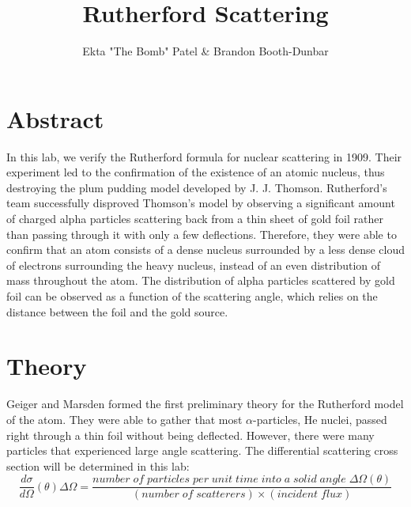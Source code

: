 
\newcommand{\ig}[2][width=4in]{\texttt{[image: \#2]}}    		
\usepackage{graphicx}					
\usepackage{amssymb}
\usepackage{pgfplotstable}
\usepackage{float}
\usepackage{caption}
\captionsetup[table]{justification=justified,singlelinecheck=false, position=bottom}


\header {\today}							
\title{Rutherford Scattering}
\author{Ekta "The Bomb" Patel \& Brandon Booth-Dunbar}

\section{Abstract}
\begin{em} In this lab, we verify the Rutherford formula for nuclear scattering in 1909. Their experiment led to the confirmation of the existence of an atomic nucleus, thus destroying the plum pudding model  developed by J. J. Thomson. Rutherford's team successfully disproved Thomson's model by observing a significant amount of charged alpha particles scattering back from a thin sheet of gold foil rather than passing through it with only a few deflections. Therefore, they were able to confirm that an atom consists of a dense nucleus surrounded by a less dense cloud of electrons surrounding the heavy nucleus, instead of an even distribution of mass throughout the atom. The distribution of alpha particles scattered by gold foil can be observed as a function of the scattering angle, which relies on the distance between the foil and the gold source. \end {em}

\section{Theory}
Geiger and Marsden formed the first preliminary theory for the Rutherford model of the atom. They were able to gather that most $\alpha$-particles, He nuclei, passed right through a thin foil without being deflected. However, there were many particles that experienced large angle scattering. The differential scattering cross section will be determined in this lab: 
\begin{equation} \frac{d\sigma}{d\Omega}(\theta)\Delta\Omega=\frac{number\;of\; particles\; per\; unit\; time\;into\;a \;solid\; angle\; \Delta\Omega(\theta)}{(number \;of\; scatterers)\times (incident\; flux)} \end{equation}

